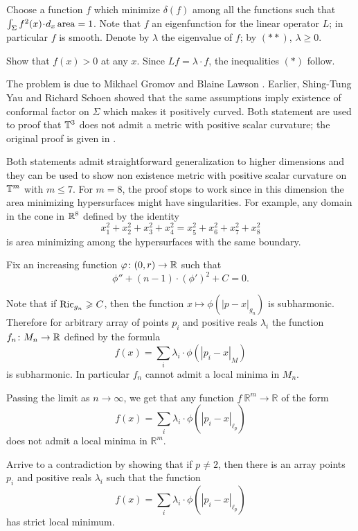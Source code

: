 Choose a function $f$ which minimize $\delta(f)$ among all the functions such that $\int_\Sigma f^2(x)\cdot d_x\area=1$.
Note that $f$ an eigenfunction 
for the linear operator $L$;
in particular $f$ is smooth.
Denote by $\lambda$ the eigenvalue of $f$;
by $({*}{*})$,
$\lambda\ge 0$.

Show that $f(x)>0$ at any $x$.
Since $Lf=\lambda\cdot f$, the inequalities $({*})$ follow.\qeds


The problem is due to Mikhael Gromov and Blaine Lawson \cite[see][]{gromov-lawson}.
Earlier, Shing-Tung  Yau and Richard Schoen showed that the same assumptions 
imply existence of conformal factor on $\Sigma$ which makes it positively curved.
Both statement are used 
to proof that $\mathbb{T}^3$ does not admit a metric with positive scalar curvature;
the original proof is given in \cite{schoen-yau}.

Both statements admit straightforward generalization to higher dimensions
and they can be used to show non existence metric with positive scalar curvature on $\mathbb{T}^m$ with $m\le 7$.
For $m=8$, the proof stops to work 
since in this dimension the area minimizing hypersurfaces might have singularities.
For example, 
any domain in the cone in $\mathbb{R}^8$
defined by the identity
\[x^2_1+x^2_2+x^2_3+x^2_4=x^2_5+x^2_6+x^2_7+x^2_8\]
is area minimizing among the hypersurfaces with the same boundary.





Fix an increasing function $\varphi\colon(0,r)\to \mathbb{R}$
such that 
\[\phi''+(n-1)\cdot(\phi')^2+C=0.\]

Note that if $\operatorname{\rm Ric}_{g_n}\geqslant C$, 
then the function 
$x\mapsto\phi(|p-x|_{g_n})$ is subharmonic.
Therefore for arbitrary array of points $p_i$ 
and positive reals $\lambda_i$ the function $f_n\colon M_n\to \mathbb{R}$
defined by the formula
$$f(x)=\sum_i\lambda_i\cdot\phi(|p_i-x|_M)$$
is subharmonic.
In particular $f_n$ cannot admit a local minima in $M_n$.

Passing the limit as $n\to \infty$, we get that any function $f\:\mathbb{R}^m\to\mathbb{R}$
of the form 
$$f(x)=\sum_i\lambda_i\cdot\phi(|p_i-x|_{\ell_p})$$
does not admit a local minima in $\mathbb{R}^m$.

Arrive to a contradiction
by showing that if $p\ne 2$,
then there is an array
points $p_i$ and positive reals $\lambda_i$
such that the function 
$$f(x)=\sum_i\lambda_i\cdot\phi(|p_i-x|_{\ell_p})$$
has strict local minimum.\qeds

